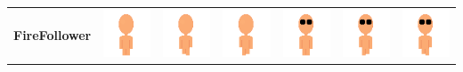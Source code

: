 \documentclass[../Main.tex]{subfiles}
\begin{document}
\begin{center}
\begin{tabular}{ | m{} | m{} m{} m{} m{} m{} m{} | }
                    \multirow{2}{*}{\textbf{FireFollower}} & \centerline{\includegraphics[scale=3]{../res/textures/entities/followers/fire/North.png}} & \centerline{\includegraphics[scale=3]{../res/textures/entities/followers/fire/North-Walk-1.png}} & \centerline{\includegraphics[scale=3]{../res/textures/entities/followers/fire/North-Walk-2.png}} & \centerline{\includegraphics[scale=3]{../res/textures/entities/followers/fire/South.png}} & \centerline{\includegraphics[scale=3]{../res/textures/entities/followers/fire/South-Walk-1.png}} & \centerline{\includegraphics[scale=3]{../res/textures/entities/followers/fire/South-Walk-2.png}} \\

\end{tabular}
\end{center}
\end{document}
